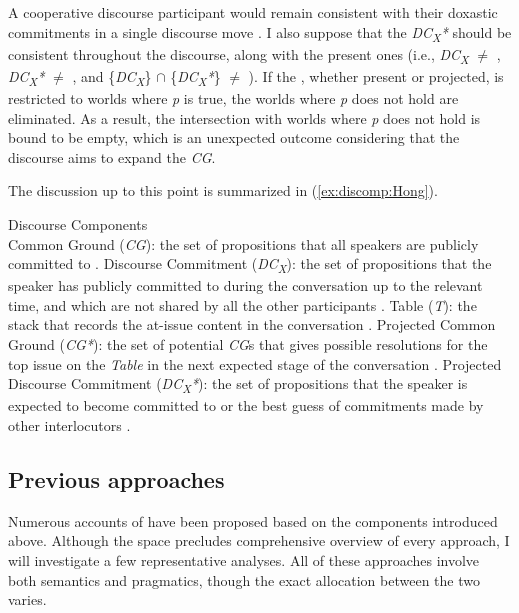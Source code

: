 \documentclass[output=paper,colorlinks,citecolor=brown]{langscibook}
\begin{document}
A cooperative discourse participant would remain consistent with their doxastic commitments in a single discourse move \citep{krifka2015bias}. I also suppose that the \textit{DC\textsubscript{X}*} should be consistent throughout the discourse, along with the present ones (i.e., \cap\textit{DC\textsubscript{X}} $\neq$ \emptyset, \cap\textit{DC\textsubscript{X}*} $\neq$ \emptyset, and \{\cap\textit{DC\textsubscript{X}}\} $\cap$ \{\cap\textit{DC\textsubscript{X}*}\} $\neq$ \emptyset). If the , whether present or projected, is restricted to worlds where \textit{p} is true, the worlds where \textit{p} does not hold are eliminated. As a result, the intersection with worlds where \textit{p} does not hold is bound to be empty, which is an unexpected outcome considering that the discourse aims to expand the \textit{CG}.

The discussion up to this point is summarized in (\ref{ex:discomp:Hong}).

\ea \label{ex:discomp:Hong}
    Discourse Components\\
    \ea \justifying Common Ground (\textit{CG}): the set of propositions that all speakers are publicly committed to \citep{stalnaker1978assertion}.
    \ex Discourse Commitment (\textit{DC\textsubscript{X}}): the set of propositions that the speaker has publicly committed to during the conversation up to the relevant time, and which are not shared by all the other participants \citep{farkas2010reacting}.
    \ex Table (\textit{T}): the stack that records the at-issue content in the conversation \citep{farkas2010reacting}.
    \ex Projected Common Ground (\textit{CG*}): the set of potential \textit{CG}s that gives possible resolutions for the top issue on the \textit{Table} in the next expected stage of the conversation \citep{farkas2010reacting, malamud2015three}.
    \ex Projected Discourse Commitment (\textit{DC\textsubscript{X}*}): the set of propositions that the speaker is expected to become committed to or the best guess of commitments made by other interlocutors \citep{malamud2015three}.
    \z
\z

\subsection{Previous approaches}
\label{sec:prev:Hong}

Numerous accounts of  have been proposed based on the components introduced above. Although the space precludes comprehensive overview of every approach, I will investigate a few representative analyses. All of these approaches involve both semantics and pragmatics, though the exact allocation between the two varies.
\end{document}
